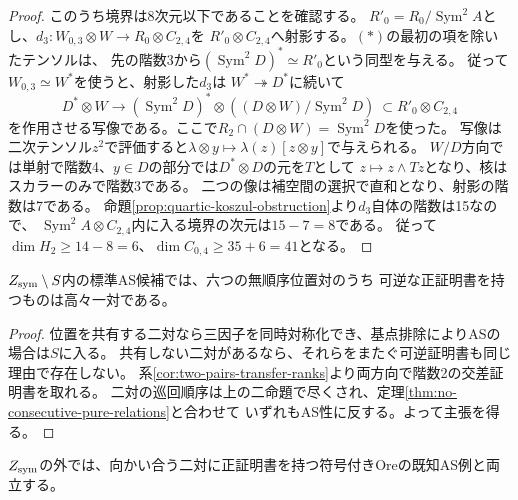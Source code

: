 \begin{proof}
このうち境界は8次元以下であることを確認する。
$R'_0=R_0/\operatorname{Sym}^2 A$とし、$d_3:W_{0,3}\otimes W\to R_0\otimes C_{2,4}$を
$R'_0\otimes C_{2,4}$へ射影する。$(*)$の最初の項を除いたテンソルは、
先の階数3から$(\operatorname{Sym}^2 D)^*\simeq R'_0$という同型を与える。
従って$W_{0,3}\simeq W^*$を使うと、射影した$d_3$は
$W^*\twoheadrightarrow D^*$に続いて
\[
 D^*\otimes W\longrightarrow
  (\operatorname{Sym}^2 D)^*\otimes ((D\otimes W)/\operatorname{Sym}^2 D)
  \ \subset R'_0\otimes C_{2,4}
\]
を作用させる写像である。ここで$R_2\cap(D\otimes W)=\operatorname{Sym}^2D$を使った。
写像は二次テンソル$z^2$で評価すると$\lambda\otimes y\mapsto\lambda(z)[z\otimes y]$で与えられる。
$W/D$方向では単射で階数4、$y\in D$の部分では$D^*\otimes D$の元を$T$として
$z\mapsto z\wedge Tz$となり、核はスカラーのみで階数3である。
二つの像は補空間の選択で直和となり、射影の階数は7である。
命題\ref{prop:quartic-koszul-obstruction}より$d_3$自体の階数は15なので、
$\operatorname{Sym}^2 A\otimes C_{2,4}$内に入る境界の次元は$15-7=8$である。
従って$\dim H_2\ge14-8=6$、$\dim C_{0,4}\ge35+6=41$となる。
\end{proof}

\begin{theorem}[対称閉包のAS残余では可逆対は高々一つ]\label{thm:no-two-pair-AS-boundary}
$Z_{\rm sym}\setminus S$内の標準AS候補では、六つの無順序位置対のうち
可逆な正証明書を持つものは高々一対である。
\end{theorem}
\begin{proof}
位置を共有する二対なら三因子を同時対称化でき、基点排除によりASの場合は$S$に入る。
共有しない二対があるなら、それらをまたぐ可逆証明書も同じ理由で存在しない。
系\ref{cor:two-pairs-transfer-ranks}より両方向で階数2の交差証明書を取れる。
二対の巡回順序は上の二命題で尽くされ、定理\ref{thm:no-consecutive-pure-relations}と合わせて
いずれもAS性に反する。よって主張を得る。
\end{proof}
$Z_{\rm sym}$の外では、向かい合う二対に正証明書を持つ符号付きOreの既知AS例と両立する。

